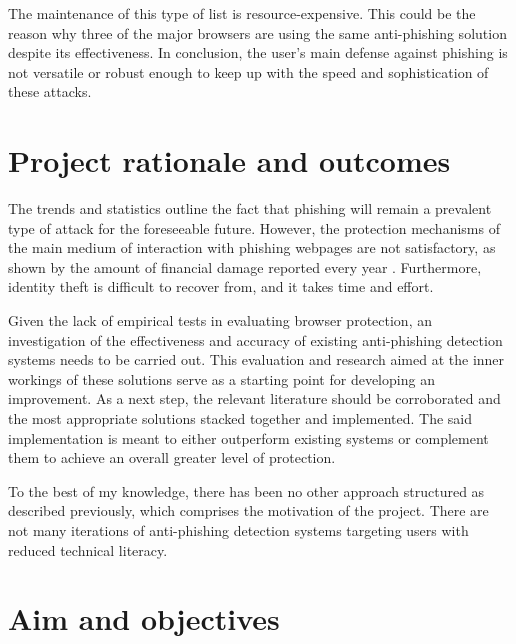 The maintenance of this type of list is resource-expensive. This could be the
reason why three of the major browsers are using the same anti-phishing solution
despite its effectiveness. In conclusion, the user's main defense against
phishing is not versatile or robust enough to keep up with the speed and
sophistication of these attacks.



\section{Project rationale and outcomes}

The trends and statistics outline the fact that phishing will remain a prevalent
type of attack for the foreseeable future. However, the protection
mechanisms of the main medium of interaction with phishing webpages are not
satisfactory, as shown by the amount of financial damage reported every year
\citep{APWG_Q42019}. Furthermore, identity theft is difficult to recover from,
and it takes time and effort.

Given the lack of empirical tests in evaluating browser protection, an
investigation of the effectiveness and accuracy of existing anti-phishing
detection systems needs to be carried out. This evaluation and research aimed at
the inner workings of these solutions serve as a starting point for developing
an improvement. As a next step, the relevant literature should be corroborated
and the most appropriate solutions stacked together and implemented. The said
implementation is meant to either outperform existing systems or complement them
to achieve an overall greater level of protection.

To the best of my knowledge, there has been no other approach structured as
described previously, which comprises the motivation of the project. There are
not many iterations of anti-phishing detection systems targeting users with
reduced technical literacy.

\section{Aim and objectives}

